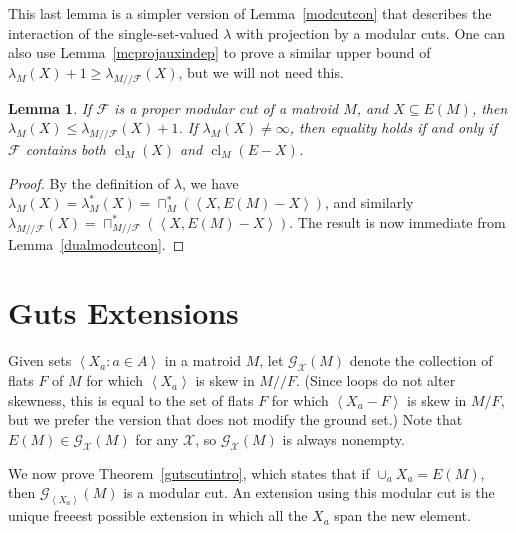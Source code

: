 \documentclass{amsart}
\theoremstyle{plain}
\newtheorem{lemma}[theorem]{Lemma}
\theoremstyle{definition}
\newcommand{\cF}{\mathcal{F}}
\newcommand{\cX}{\mathcal{X}}
\newcommand{\dcon}{/ \!\! /}
\DeclareMathOperator{\cl}{cl}
\newcommand{\con}{/}
\newcommand{\ab}[1]{\left\langle#1\right\rangle}
\renewcommand{\le}{\leqslant}
\renewcommand{\ge}{\geqslant}
\renewcommand{\ss}{\subseteq}
\newcommand{\gutscut}[2]{{\mathcal{G}}_{#2}(#1)}
\begin{document}


This last lemma is a simpler version of Lemma~\ref{modcutcon} that describes
the interaction of the single-set-valued $\lambda$ with projection by a modular cuts. 
One can also use Lemma~\ref{mcprojauxindep} to prove a similar upper bound 
of $\lambda_{M}(X) + 1 \ge \lambda_{M \dcon \cF}(X)$, but we will not need this. 

\begin{lemma}\label{modcutlambda}
  If $\cF$ is a proper modular cut of a matroid $M$, and $X \ss E(M)$, then 
  $\lambda_M(X) \le \lambda_{M \dcon \cF}(X) + 1$. 
  If $\lambda_M(X) \ne \infty$, then equality holds 
  if and only if $\cF$ contains both $\cl_M(X)$ and $\cl_M(E-X)$. 
\end{lemma}
\begin{proof}
  By the definition of $\lambda$, we have $\lambda_M(X) = \lambda_M^*(X) =  \sqcap_M^*(\ab{X,E(M)-X})$, 
  and similarly $\lambda_{M \dcon \cF}(X) = \sqcap_{M \dcon \cF}^*(\ab{X,E(M)-X})$. 
  The result is now immediate from Lemma~\ref{dualmodcutcon}. 
\end{proof}

\section{Guts Extensions}


Given sets $\ab{X_a : a \in A}$ in a matroid $M$, let $\gutscut{M}{\cX}$ denote the collection of flats $F$ of $M$ 
for which $\ab{X_a}$ is skew in $M \dcon F$. 
(Since loops do not alter skewness, this is equal to the set of flats $F$
for which $\ab{X_a-F}$ is skew in $M \con F$, but we prefer the version that
does not modify the ground set.)
Note that $E(M) \in \gutscut{M}{\cX}$ for any $\cX$, so $\gutscut{M}{\cX}$ is always nonempty. 

We now prove Theorem~\ref{gutscutintro}, which states that if $\cup_a X_a = E(M)$, 
then $\gutscut{M}{\ab{X_a}}$ 
is a modular cut. An extension using this modular cut is the unique freeest possible extension 
in which all the $X_a$ span the new element. 
\end{document}
